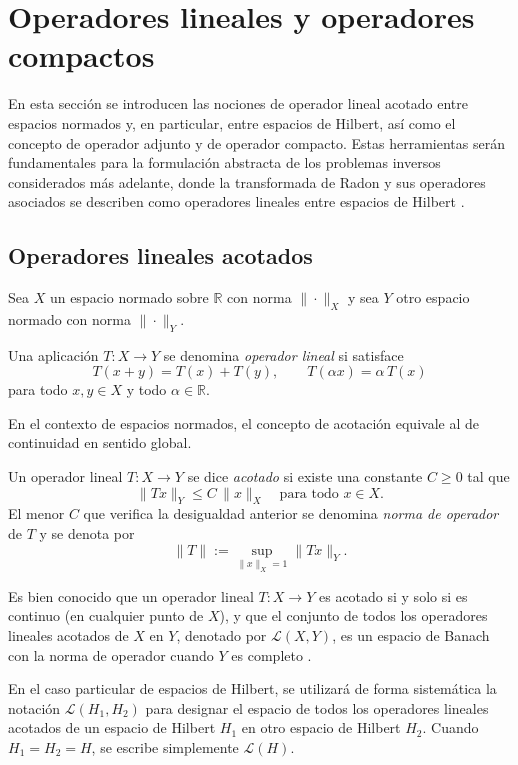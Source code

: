 \section{Operadores lineales y operadores compactos}
\label{Operators}

En esta sección se introducen las nociones de operador lineal acotado entre espacios normados y, en particular, entre espacios de Hilbert, así como el concepto de operador adjunto y de operador compacto. Estas herramientas serán fundamentales para la formulación abstracta de los problemas inversos considerados más adelante, donde la transformada de Radon y sus operadores asociados se describen como operadores lineales entre espacios de Hilbert \cite{kirsch2011,natterer2001,kuchment2014}.


\subsection{Operadores lineales acotados}

Sea $X$ un espacio normado sobre $\mathbb{R}$ con norma $\|\cdot\|_{X}$ y sea $Y$ otro espacio normado con norma $\|\cdot\|_{Y}$.

\begin{definition}
Una aplicación $T : X \to Y$ se denomina \emph{operador lineal} si satisface
\[
T(x + y) = T(x) + T(y), \qquad T(\alpha x) = \alpha\,T(x)
\]
para todo $x,y \in X$ y todo $\alpha \in \mathbb{R}$.
\end{definition}

En el contexto de espacios normados, el concepto de acotación equivale al de continuidad en sentido global.

\begin{definition}
Un operador lineal $T : X \to Y$ se dice \emph{acotado} si existe una constante $C \ge 0$ tal que
\[
\|T x\|_{Y} \le C\,\|x\|_{X} \quad \text{para todo } x \in X.
\]
El menor $C$ que verifica la desigualdad anterior se denomina \emph{norma de operador} de $T$ y se denota por
\[
\|T\| := \sup_{\|x\|_{X} = 1} \|T x\|_{Y}.
\]
\end{definition}

Es bien conocido que un operador lineal $T : X \to Y$ es acotado si y solo si es continuo (en cualquier punto de $X$), y que el conjunto de todos los operadores lineales acotados de $X$ en $Y$, denotado por $\mathcal{L}(X,Y)$, es un espacio de Banach con la norma de operador cuando $Y$ es completo \cite{rynne_youngson2000}.

En el caso particular de espacios de Hilbert, se utilizará de forma sistemática la notación $\mathcal{L}(H_{1},H_{2})$ para designar el espacio de todos los operadores lineales acotados de un espacio de Hilbert $H_{1}$ en otro espacio de Hilbert $H_{2}$. Cuando $H_{1} = H_{2} = H$, se escribe simplemente $\mathcal{L}(H)$.


